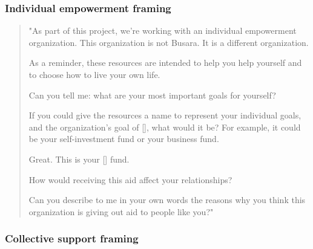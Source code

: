 \documentclass[11pt, a4paper]{article}\usepackage[]{graphicx}\usepackage[]{color}
\begin{document}
        \subsubsection{Individual empowerment framing}

            \begin{quote}

                "As part of this project, we're working with an individual empowerment organization. This organization is not Busara. It is a different organization.

                As a reminder, these resources are intended to help you help yourself and to choose how to live your own life.

                Can you tell me: what are your most important goals for yourself?

                If you could give the resources a name to represent your individual goals, and the organization's goal of [], what would it be?  For example, it could be your self-investment fund or your business fund.

                Great. This is your [] fund.

                How would receiving this aid affect your relationships?

                Can you describe to me in your own words the reasons why you think this organization is giving out aid to people like you?"

            \end{quote}

        \subsubsection{Collective support framing}
\end{document}
